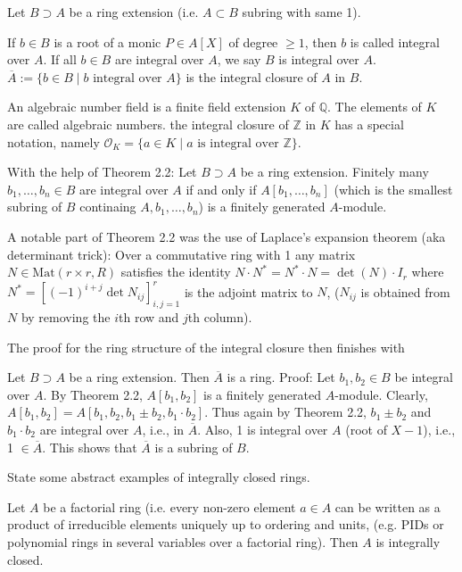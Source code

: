 Let \( B \supset A \) be a ring extension (i.e. \( A \subset B \) subring with same 1).

If \( b \in B \) is a root of a monic \( P \in A[X] \) of degree \(\geq 1\), then \( b \) is called integral over \( A \).
If all \( b \in B \) are integral over \( A \), we say \( B \) is integral over \( A \).
\( \overline{A} := \{ b \in B \mid b \text{ integral over } A \} \) is the integral closure of \( A \) in \( B \).

An algebraic number field is a finite field extension \( K \) of \( \mathbb{Q} \). The elements of \( K \) are called algebraic numbers.
the integral closure of \( \mathbb{Z} \) in \( K \) has a special notation, namely \( \mathcal{O}_K = \{a \in K \mid a \text{ is integral over } \mathbb{Z} \} \).

With the help of Theorem 2.2:
Let \( B \supset A \) be a ring extension. 
Finitely many \( b_1, \ldots, b_n \in B \) are integral over \( A \) if and only if \( A[b_1, \ldots, b_n] \) (which is the smallest subring of \( B\) 
continaing \( A, b_1, \ldots, b_n \)) is a finitely generated \( A \)-module.

A notable part of Theorem 2.2 was the use of Laplace’s expansion theorem (aka determinant trick): 
Over a commutative ring with 1 any matrix \(N \in \text{Mat}(r \times r, R) \) satisfies the identity
\(
N \cdot N^* = N^* \cdot N = \det(N) \cdot I_r
\)
where \( N^\ast = \left[(-1)^{i+j} \det N_{ij}\right]_{i,j=1}^{r} \) is the adjoint matrix to  \( N \), 
(\(N_{ij}\) is obtained from \( N \) by removing the \( i \)th row and \( j \)th column).

The proof for the ring structure of the integral closure then finishes with

Let \( B \supset A \) be a ring extension. Then \( \overline{A} \) is a ring.
Proof: 
Let \( b_1, b_2 \in B \) be integral over \( A \). By Theorem 2.2, \( A[b_1, b_2] \) is a finitely generated \( A \)-module. 
Clearly, \( A[b_1, b_2] = A[b_1, b_2, b_1 \pm b_2, b_1 \cdot b_2] \). 
Thus again by Theorem 2.2, \( b_1 \pm b_2 \) and \( b_1 \cdot b_2 \) are integral over \( A \), i.e., in \( \overline{A} \). 
Also, 1 is integral over \( A \) (root of \( X - 1 \)), i.e., 1 \( \in \overline{A} \). This shows that \( \overline{A} \) is a subring of \( B \).


State some abstract examples of integrally closed rings.

Let \( A \) be a factorial ring (i.e. every non-zero element \( a \in A \) can be written as a product of irreducible elements uniquely up to ordering and units, 
(e.g. PIDs or polynomial rings in several variables over a factorial ring). Then \( A \) is integrally closed.

